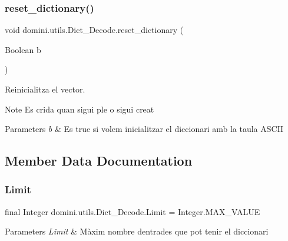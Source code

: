 \subsubsection{\texorpdfstring{reset\+\_\+dictionary()}{reset\_dictionary()}}
{\footnotesize\ttfamily void domini.\+utils.\+Dict\+\_\+\+Decode.\+reset\+\_\+dictionary (\begin{DoxyParamCaption}\item[{Boolean}]{b }\end{DoxyParamCaption})\hspace{0.3cm}{\ttfamily [inline]}}



Reinicialitza el vector. 

\begin{DoxyNote}{Note}
Es crida quan sigui ple o sigui creat 
\end{DoxyNote}

\begin{DoxyParams}{Parameters}
{\em b} & Es true si volem inicialitzar el diccionari amb la taula A\+S\+C\+II \\
\hline
\end{DoxyParams}


\subsection{Member Data Documentation}
\mbox{\label{classdomini_1_1utils_1_1Dict__Decode_a10fd6693de70b9091942496b35324c5a}} 
\subsubsection{\texorpdfstring{Limit}{Limit}}
{\footnotesize\ttfamily final Integer domini.\+utils.\+Dict\+\_\+\+Decode.\+Limit = Integer.\+M\+A\+X\+\_\+\+V\+A\+L\+UE\hspace{0.3cm}{\ttfamily [package]}}


\begin{DoxyParams}{Parameters}
{\em Limit} & Màxim nombre d\textquotesingle{}entrades que pot tenir el diccionari \\
\hline
\end{DoxyParams}
\mbox{\label{classdomini_1_1utils_1_1Dict__Decode_a351bb8836b391e5e21ebc9cc1943a22d}} 
